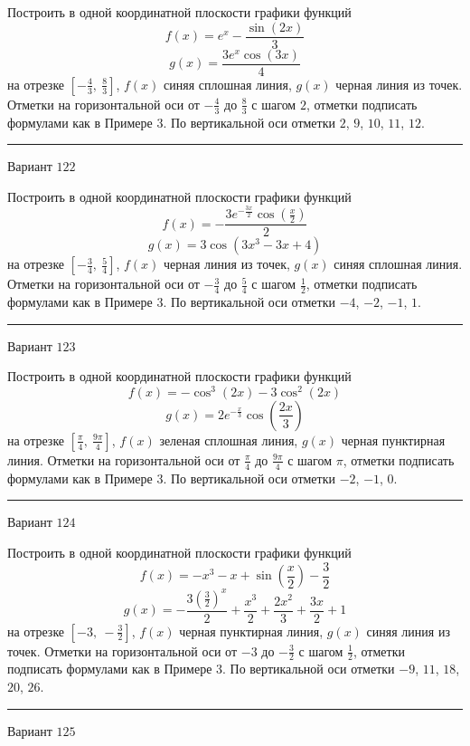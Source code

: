 \documentclass[11pt]{report}
\begin{document}
Построить в одной координатной плоскости графики функций $$f(x) = e^{x} - \frac{\sin{\left(2 x \right)}}{3}$$ $$g(x) = \frac{3 e^{x} \cos{\left(3 x \right)}}{4}$$ на отрезке $\left[- \frac{4}{3}, \  \frac{8}{3}\right]$, $f(x)$ синяя сплошная линия, $g(x)$ черная линия из точек. Отметки на горизонтальной оси от $- \frac{4}{3}$ до $\frac{8}{3}$ с шагом $2$, отметки подписать формулами как в Примере 3. По вертикальной оси отметки $2$, $9$, $10$, $11$, $12$.
\begin{center}
\noindent\rule{8cm}{0.4pt}
\end{center}
Вариант $122$


Построить в одной координатной плоскости графики функций $$f(x) = - \frac{3 e^{- \frac{3 x}{2}} \cos{\left(\frac{x}{2} \right)}}{2}$$ $$g(x) = 3 \cos{\left(3 x^{3} - 3 x + 4 \right)}$$ на отрезке $\left[- \frac{3}{4}, \  \frac{5}{4}\right]$, $f(x)$ черная линия из точек, $g(x)$ синяя сплошная линия. Отметки на горизонтальной оси от $- \frac{3}{4}$ до $\frac{5}{4}$ с шагом $\frac{1}{2}$, отметки подписать формулами как в Примере 3. По вертикальной оси отметки $-4$, $-2$, $-1$, $1$.
\begin{center}
\noindent\rule{8cm}{0.4pt}
\end{center}
Вариант $123$


Построить в одной координатной плоскости графики функций $$f(x) = - \cos^{3}{\left(2 x \right)} - 3 \cos^{2}{\left(2 x \right)}$$ $$g(x) = 2 e^{- \frac{x}{3}} \cos{\left(\frac{2 x}{3} \right)}$$ на отрезке $\left[\frac{\pi}{4}, \  \frac{9 \pi}{4}\right]$, $f(x)$ зеленая сплошная линия, $g(x)$ черная пунктирная линия. Отметки на горизонтальной оси от $\frac{\pi}{4}$ до $\frac{9 \pi}{4}$ с шагом $\pi$, отметки подписать формулами как в Примере 3. По вертикальной оси отметки $-2$, $-1$, $0$.
\begin{center}
\noindent\rule{8cm}{0.4pt}
\end{center}
Вариант $124$


Построить в одной координатной плоскости графики функций $$f(x) = - x^{3} - x + \sin{\left(\frac{x}{2} \right)} - \frac{3}{2}$$ $$g(x) = - \frac{3 \left(\frac{3}{2}\right)^{x}}{2} + \frac{x^{3}}{2} + \frac{2 x^{2}}{3} + \frac{3 x}{2} + 1$$ на отрезке $\left[-3, \  - \frac{3}{2}\right]$, $f(x)$ черная пунктирная линия, $g(x)$ синяя линия из точек. Отметки на горизонтальной оси от $-3$ до $- \frac{3}{2}$ с шагом $\frac{1}{2}$, отметки подписать формулами как в Примере 3. По вертикальной оси отметки $-9$, $11$, $18$, $20$, $26$.
\begin{center}
\noindent\rule{8cm}{0.4pt}
\end{center}
Вариант $125$
\end{document}
